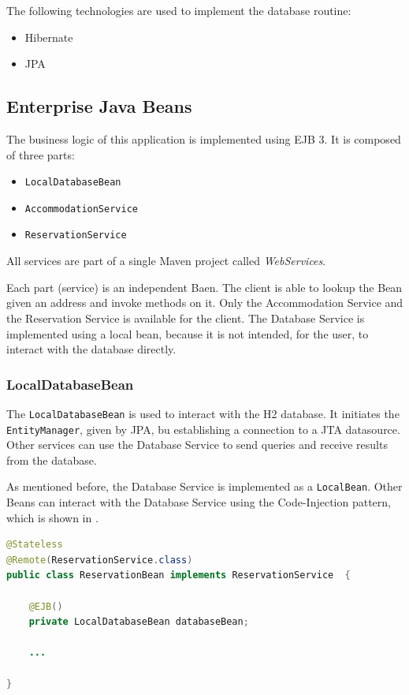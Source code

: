 The following technologies are used to implement the database routine:
\begin{itemize}
\item Hibernate
\item JPA
\end{itemize}


\subsection{Enterprise Java Beans}
The business logic of this application is implemented using EJB 3. It is composed of three parts:
\begin{itemize}
\item \texttt{LocalDatabaseBean}
\item \texttt{AccommodationService}
\item \texttt{ReservationService}
\end{itemize}
All services are part of a single Maven project called \textit{WebServices}.

Each part (service) is an independent Baen. The client is able to lookup the Bean given an address and invoke methods on it. Only the Accommodation Service and the Reservation Service is available for the client. The Database Service is implemented using a local bean, because it is not intended, for the user, to interact with the database directly.


\subsubsection{LocalDatabaseBean}
The \texttt{LocalDatabaseBean} is used to interact with the H2 database. It initiates the \texttt{EntityManager}, given by JPA, bu establishing a connection to a JTA datasource. Other services can use the Database Service to send queries and receive results from the database.

As mentioned before, the Database Service is implemented as a \texttt{LocalBean}. Other Beans can interact with the Database Service using the Code-Injection pattern, which is shown in .
\begin{lstlisting}[label=lst:02_impl_ejb_db_cinjection, caption=Usage of the \texttt{LocalDatabaseBean} using Code-Injection, language=java]
@Stateless
@Remote(ReservationService.class)
public class ReservationBean implements ReservationService  {

    @EJB()
    private LocalDatabaseBean databaseBean;
    
    ...
    
}
\end{lstlisting}


